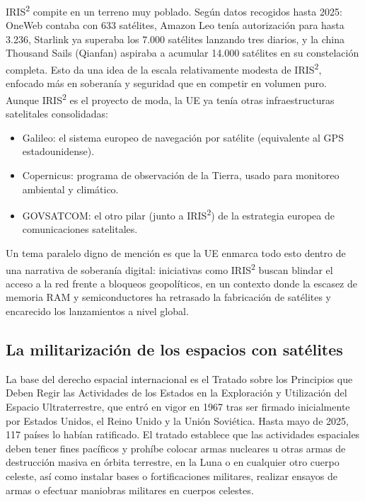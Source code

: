 IRIS\textsuperscript{2} compite en un terreno muy poblado. Según datos recogidos hasta 2025: OneWeb contaba con 633 satélites, Amazon Leo tenía autorización para hasta 3.236, Starlink ya superaba los 7.000 satélites lanzando tres diarios, y la china Thousand Sails (Qianfan) aspiraba a acumular 14.000 satélites en su constelación completa. Esto da una idea de la escala relativamente modesta de IRIS\textsuperscript{2}, enfocado más en soberanía y seguridad que en competir en volumen puro.
Aunque IRIS\textsuperscript{2} es el proyecto de moda, la UE ya tenía otras infraestructuras satelitales consolidadas:

\begin{itemize}
    \item{Galileo}: el sistema europeo de navegación por satélite (equivalente al GPS estadounidense).
    \item{Copernicus}: programa de observación de la Tierra, usado para monitoreo ambiental y climático.
    \item{GOVSATCOM}: el otro pilar (junto a IRIS\textsuperscript{2}) de la estrategia europea de comunicaciones satelitales.
\end{itemize}

Un tema paralelo digno de mención es que la UE enmarca todo esto dentro de una narrativa de soberanía digital: iniciativas como IRIS\textsuperscript{2} buscan blindar el acceso a la red frente a bloqueos geopolíticos, en un contexto donde la escasez de memoria RAM y semiconductores ha retrasado la fabricación de satélites y encarecido los lanzamientos a nivel global.

\subsection{La militarización de los espacios con satélites}

La base del derecho espacial internacional es el Tratado sobre los Principios que Deben Regir las Actividades de los Estados en la Exploración y Utilización del Espacio Ultraterrestre, que entró en vigor en 1967 tras ser firmado inicialmente por Estados Unidos, el Reino Unido y la Unión Soviética. Hasta mayo de 2025, 117 países lo habían ratificado. El tratado establece que las actividades espaciales deben tener fines pacíficos y prohíbe colocar armas nucleares u otras armas de destrucción masiva en órbita terrestre, en la Luna o en cualquier otro cuerpo celeste, así como instalar bases o fortificaciones militares, realizar ensayos de armas o efectuar maniobras militares en cuerpos celestes.

